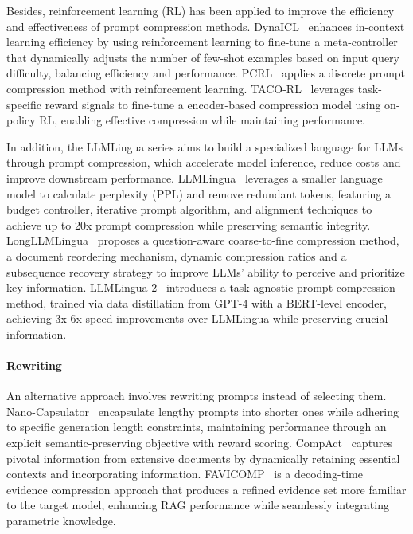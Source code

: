 \documentclass[11pt, a4paper, logo, copyright, nonumbering]{map}
\begin{document}
Besides, reinforcement learning (RL) has been applied to improve the efficiency and effectiveness of prompt compression methods. DynaICL~\citep{zhou2023dynaicl} enhances in-context learning efficiency by using reinforcement learning to fine-tune a meta-controller that dynamically adjusts the number of few-shot examples based on input query difficulty, balancing efficiency and performance. PCRL~\cite{Jung_2024} applies a discrete prompt compression method with reinforcement learning. TACO-RL~\cite{shandilya2024tacorltaskawareprompt} leverages task-specific reward signals to fine-tune a encoder-based compression model using on-policy RL, enabling effective compression while maintaining performance. 

In addition, the LLMLingua series aims to build a specialized language for LLMs through prompt compression, which accelerate model inference, reduce costs and improve downstream performance.
LLMLingua~\cite{jiang-etal-2023-llmlingua} leverages a smaller language model to calculate perplexity (PPL) and remove redundant tokens, featuring a budget controller, iterative prompt algorithm, and alignment techniques to achieve up to 20x prompt compression while preserving semantic integrity. LongLLMLingua~\cite{jiang-etal-2024-longllmlingua} proposes a question-aware coarse-to-fine compression method, a document reordering mechanism, dynamic compression ratios and a subsequence recovery strategy to improve LLMs’ ability to perceive and prioritize key information. LLMLingua-2~\cite{pan-etal-2024-llmlingua} introduces a task-agnostic prompt compression method, trained via data distillation from GPT-4 with a BERT-level encoder, achieving 3x-6x speed improvements over LLMLingua while preserving crucial information.

\paragraph{Rewriting}
An alternative approach involves rewriting prompts instead of selecting them. Nano-Capsulator~\cite{chuang-etal-2024-learning} encapsulate lengthy prompts into shorter ones while adhering to specific generation length constraints, maintaining performance through an explicit semantic-preserving objective with reward scoring. CompAct~\cite{yoon-etal-2024-compact} captures pivotal information from extensive documents by dynamically retaining essential contexts and incorporating information. FAVICOMP~\cite{jung2024familiarityawareevidencecompressionretrievalaugmented} is a decoding-time evidence compression approach that produces a refined evidence set more familiar to the target model, enhancing RAG performance while seamlessly integrating parametric knowledge.
\end{document}
